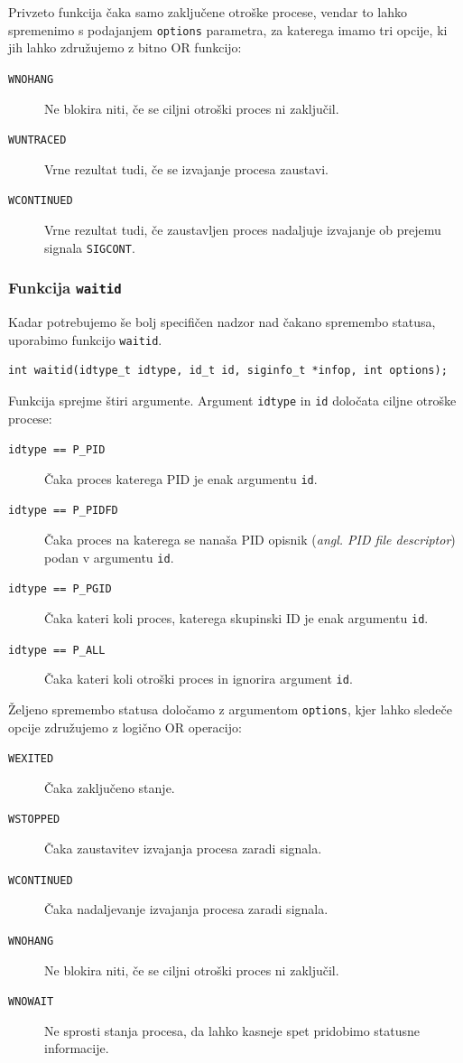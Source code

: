 \documentclass[a4paper,12pt,openright]{book}
\begin{document}
Privzeto funkcija čaka samo zaključene otroške procese, vendar to lahko spremenimo s podajanjem \texttt{options} parametra, za katerega imamo tri opcije, ki jih lahko združujemo z bitno OR funkcijo:
\begin{description}
	\item [\texttt{WNOHANG}] Ne blokira niti, če se ciljni otroški proces ni zaključil.
	\item [\texttt{WUNTRACED}] Vrne rezultat tudi, če se izvajanje procesa zaustavi.
	\item [\texttt{WCONTINUED}] Vrne rezultat tudi, če zaustavljen proces nadaljuje izvajanje ob prejemu signala \texttt{SIGCONT}.
\end{description}

\subsubsection{Funkcija \texttt{waitid}}

Kadar potrebujemo še bolj specifičen nadzor nad čakano spremembo statusa, uporabimo funkcijo \texttt{waitid}.

\begin{lstlisting}[style=func]
	int waitid(idtype_t idtype, id_t id, siginfo_t *infop, int options);
\end{lstlisting}

Funkcija sprejme štiri argumente.
Argument \texttt{idtype} in \texttt{id} določata ciljne otroške procese:
\begin{description}
	\item [\texttt{idtype == P\_PID}] Čaka proces katerega PID je enak argumentu \texttt{id}.
	\item [\texttt{idtype == P\_PIDFD}] Čaka proces na katerega se nanaša PID opisnik (\textit{angl. PID file descriptor}) podan v argumentu \texttt{id}.
	\item [\texttt{idtype == P\_PGID}] Čaka kateri koli proces, katerega skupinski ID je enak argumentu \texttt{id}.
	\item [\texttt{idtype == P\_ALL}] Čaka kateri koli otroški proces in ignorira argument \texttt{id}.
\end{description}

Željeno spremembo statusa določamo z argumentom \texttt{options}, kjer lahko sledeče opcije združujemo z logično OR operacijo:
\begin{description}
	\item [\texttt{WEXITED}] Čaka zaključeno stanje.
	\item [\texttt{WSTOPPED}] Čaka zaustavitev izvajanja procesa zaradi signala.
	\item [\texttt{WCONTINUED}] Čaka nadaljevanje izvajanja procesa zaradi signala.
	\item [\texttt{WNOHANG}] Ne blokira niti, če se ciljni otroški proces ni zaključil.
	\item [\texttt{WNOWAIT}] Ne sprosti stanja procesa, da lahko kasneje spet pridobimo statusne informacije.
\end{description}
\end{document}
